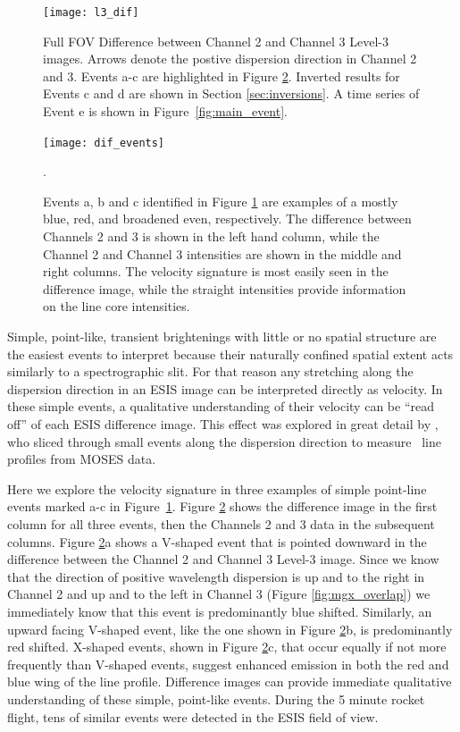    		\begin{figure}[htb!]
   			\centering
   			\texttt{[image: l3\_dif]}
   			\caption{Full FOV Difference between Channel 2 and Channel 3 Level-3 images.  
   			Arrows denote the postive dispersion direction in Channel 2 and 3.
   			Events a-c are highlighted in Figure \ref{fig:dif_events}.    
   			Inverted results for Events c and d are shown in Section \ref{sec:inversions}. 
   			A time series of Event e is shown in Figure~\ref{fig:main_event}.}
   			\label{fig:l3_dif}
   		\end{figure}
   	
   	
 		\begin{figure}[htb!]
   			\centering
   			\texttt{[image: dif\_events]}
   			\caption{Events a, b and c identified in Figure \ref{fig:l3_dif} are examples of a mostly blue, red, and broadened even, respectively. The difference between Channels 2 and 3 is shown in the left hand column, while the Channel 2 and Channel 3 intensities are shown in the middle and right columns.  The velocity signature is most easily seen in the difference image, while the straight intensities provide information on the line core intensities. 
   			}
   			\label{fig:dif_events}. 
   		\end{figure}

    	Simple, point-like, transient brightenings with little or no spatial structure are the easiest events to interpret because their naturally confined spatial extent acts similarly to a spectrographic slit.
    	For that reason any stretching along the dispersion direction in an ESIS image can be interpreted directly as velocity. 
    	In these simple events, a qualitative understanding of their velocity can be ``read off'' of each ESIS difference image.
    	This effect was explored in great detail by \citet{Rust2019}, who sliced through small events along the dispersion direction to measure \heii \ line profiles from MOSES data.
    	
    	Here we explore the velocity signature in three examples of simple point-line events marked a-c in Figure~\ref{fig:l3_dif}.  
    	Figure \ref{fig:dif_events} shows the difference image in the first column for all three events, then the Channels 2 and 3 data in the subsequent columns. 
    	Figure \ref{fig:dif_events}a shows a V-shaped event that is pointed downward in the difference between the Channel 2 and Channel 3 Level-3 image.
    	Since we know that the direction of positive wavelength dispersion is up and to the right in Channel 2 and up and to the left in Channel 3 (Figure \ref{fig:mgx_overlap}) we immediately know that this event is predominantly blue shifted.  
    	Similarly, an upward facing V-shaped event, like the one shown in Figure \ref{fig:dif_events}b, is predominantly red shifted.
    	X-shaped events, shown in Figure \ref{fig:dif_events}c, that occur equally if not more frequently than V-shaped events, suggest enhanced emission in both the red and blue wing of the line profile.
    	Difference images can provide immediate qualitative understanding of these simple, point-like events.  
    	During the 5 minute rocket flight, tens of similar events were detected in the ESIS field of view.  
    	
